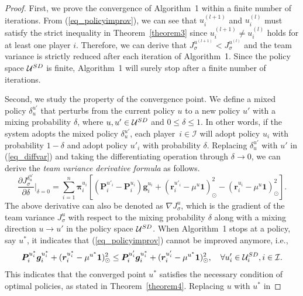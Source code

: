 \documentclass[10pt,a4paper]{amsart}
\begin{document}
\begin{proof}
First, we prove the convergence of Algorithm~1 within a finite
number of iterations. From (\ref{eq_policyimprov}), we can see that
$u_i^{(l+1)}$ and $u_i^{(l)}$ must satisfy the strict inequality in
Theorem~\ref{theorem3} since $u_i^{(l+1)} \neq u_i^{(l)}$ holds for
at least one player $i$. Therefore, we can derive that
$J^{u^{(l+1)}}_{\sigma} < J^{u^{(l)}}_{\sigma}$ and the team
variance is strictly reduced after each iteration of Algorithm~1.
Since the policy space $\mathcal U^{\rm SD}$ is finite, Algorithm~1
will surely stop after a finite number of iterations.

Second, we study the property of the convergence point. We define a
mixed policy $\delta^{u'}_{u}$ that perturbs from the current policy
$u$ to a new policy $u'$ with a mixing probability $\delta$, where
$u,u' \in \mathcal U^{\rm SD}$ and $0\leq \delta \leq 1$. In other
words, if the system adopts the mixed policy $\delta^{u'}_{u}$, each
player~$i \in \mathcal I$ will adopt policy $u_i$ with probability
$1-\delta$ and adopt policy $u'_i$ with probability $\delta$.
Replacing $\delta^{u'}_{u}$ with $u'$ in (\ref{eq_diffvar}) and
taking the differentiating operation through $\delta \rightarrow 0$,
we can derive the \emph{team variance derivative formula} as
follows.
\begin{equation}\label{eq_derivvar}
\frac{\partial J^{\delta^{u'}_{u}}_{\sigma}}{\partial \delta}
\Big|_{\delta=0} = \sum_{i=1}^{n} \bm \pi^{u_i}_i[(\bm P^{u'_i}_i -
\bm P^{u_i}_i)\bm g^{u_i}_i + (\bm r^{u'_i}_i - \mu^u \bm
1)^2_{\odot} - (\bm r^{u_i}_i - \mu^u \bm 1)^2_{\odot}].
\end{equation}
The above derivative can also be denoted as $\nabla J^{u}_{\sigma}$,
which is the gradient of the team variance $J^{u}_{\sigma}$ with
respect to the mixing probability $\delta$ along with a mixing
direction $u \rightarrow u'$ in the policy space $\mathcal U^{\rm
SD}$. When Algorithm~1 stops at a policy, say $u^*$, it indicates
that (\ref{eq_policyimprov}) cannot be improved anymore, i.e.,
\begin{equation}\label{eq29}
\bm P^{u^*_i}_i \bm g^{u^*_i}_i + (\bm r^{u^*_i}_i - \mu^{u^*} \bm
1)^2_{\odot} \leq \bm P^{u'_i}_i \bm g^{u^*_i}_i + (\bm r^{u'_i}_i -
\mu^{u^*} \bm 1)^2_{\odot}, \quad \forall u'_i \in \mathcal U^{\rm
SD}_i, i \in \mathcal I.
\end{equation}
This indicates that the converged point $u^*$ satisfies the
necessary condition of optimal policies, as stated in
Theorem~\ref{theorem4}. Replacing $u$ with $u^*$ in

\end{proof}
\end{document}
